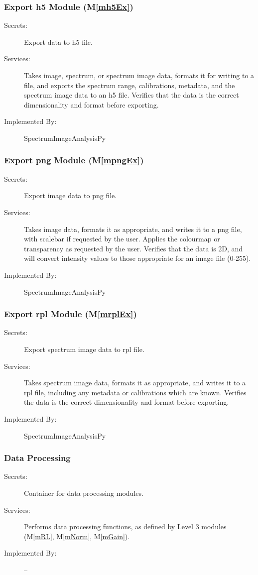 \documentclass[12pt, titlepage]{article}
\newcommand{\mref}[1]{M\ref{#1}}
\newcommand{\progname}{SpectrumImageAnalysisPy}
\begin{document}
\subsubsection{Export h5 Module (\mref{mh5Ex})}
\begin{description}
	\item[Secrets:]Export data to h5 file.
	\item[Services:]Takes image, spectrum, or spectrum image data, formats it for
writing to a file, and exports the spectrum range, calibrations, metadata, and
the spectrum image data to an h5 file. Verifies that the data is the correct
dimensionality and format before exporting.
	\item[Implemented By:] \progname
\end{description}

\subsubsection{Export png Module (\mref{mpngEx})}
\begin{description}
	\item[Secrets:]Export image data to png file.
	\item[Services:]Takes image data, formats it as appropriate, and writes it to a
png file, with scalebar if requested by the user. Applies the colourmap or
transparency as requested by the user. Verifies that the data is 2D, and will
convert intensity values to those appropriate for an image file (0-255).
	\item[Implemented By:] \progname
\end{description}

\subsubsection{Export rpl Module (\mref{mrplEx})}
\begin{description}
	\item[Secrets:]Export spectrum image data to rpl file.
	\item[Services:]Takes spectrum image data, formats it as appropriate, and
writes it to a rpl file, including any metadata or calibrations which are known.
Verifies the data is the correct dimensionality and format before exporting.
	\item[Implemented By:] \progname
\end{description}

\subsubsection{Data Processing}
\begin{description}
	\item[Secrets:]Container for data processing modules.
	\item[Services:]Performs data processing functions, as defined by Level 3
modules (\mref{mRL}, \mref{mNorm}, \mref{mGain}).
	\item[Implemented By:] --
\end{description}
\end{document}
